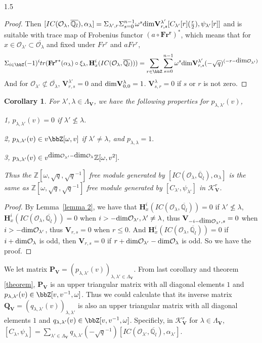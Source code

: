 \documentclass[10pt]{amsart}
\newtheorem{corollary}[theorem]{Corollary}
\def\dim{\mbox{\rm dim}}   \def\End{\mbox{\rm End}}
\def\bfV{{\mathbf V}}
\def\bfH{{\mathbf H}} \def\bfP{{\mathbf P}} \def\bfa{{\bf a}}
\def\bfV{\mathbf{V}}
\newcommand\bbq{{\mathbb Q}}
\newcommand\mk{{\mathcal{K}}}
\newcommand\mo{{\mathcal{O}}}
\begin{document}
\begin{spacing}{1.5}
\begin{proof}
Then $[IC(\mo_{\lambda},\overline{\bbq_l}),\alpha_{\lambda}]=\Sigma_{\lambda',r}\Sigma_{s=0}^{n-1}\omega^s \dim \bfV^{\lambda'}_{r,s} [C_{\lambda'}[r](\frac{r}{2}),\psi_{\lambda'}[r]]$ and is suitable with trace map of Frobenius functor  $(a\circ \mathbf{Fr^r})^*$, which means that for $x\in \mo_{\lambda'}\subset \overline{\mo_{\lambda}}$ and fixed under $Fr^r$ and $aFr^r$, $$\Sigma_{i\in \bbZ}(-1)^i tr(\mathbf{Fr^r}^*(\alpha_{\lambda})\circ \xi_{\lambda}, \bfH_x^i(IC(\mo_{\lambda},\overline{\bbq_l})))=\sum_{r\in \bbZ}\sum_{s=0}^{n-1}\omega^s \dim \bfV^{\lambda'}_{r,s} (-\sqrt{q})^{(-r-\dim \mo_{\lambda'})}$$
And for $\mo_{\lambda'}\not\subset \overline{\mo_{\lambda}}$, $\bfV_{r,s}^{\lambda'}=0$ and $\dim \bfV^{\lambda}_{0,0}=1$. $\bfV^{\lambda}_{s,r}=0$ if $s$ or $r$ is not zero. 
\end{proof}
\begin{corollary}
    For $\lambda', \lambda\in \Lambda_{\bfV}$, we have the following properties for $p_{\lambda,\lambda'}(v)$,

    1, $p_{\lambda, \lambda'}(v) = 0$ if $\lambda'\nleqslant \lambda$.

    2, $p_{\lambda, \lambda'}(v)\in v\bbZ[\omega,v]$ if $\lambda'\not=\lambda$, and $p_{\lambda, \lambda} = 1.$

    3, $p_{\lambda, \lambda'}(v) \in v^{\dim\mo_{\lambda'}-\dim\mo_{\lambda}}\mathbb{Z}[\omega,v^2].$

    Thus the $\mathbb{Z}[\omega,\sqrt{q},\sqrt{q}^{-1}]$ free module generated by $[IC(\mathcal{O}_{\lambda}, \overline{\mathbb{Q}}_l), \alpha_{\lambda}]$ is the same as $\mathbb{Z}[\omega,\sqrt{q},\sqrt{q}^{-1}]$ free module generated by $[C_{\lambda'}, \psi_{\lambda'}]$ in $\mk_{\bfV}^r$.
\end{corollary}
\begin{proof}
    By Lemma~\ref{lemma 2}, we have that $\bfH^i_x(IC(\mo_{\lambda},\overline{\bbq_l}))=0$ if $\lambda'\nleqslant \lambda$, $\bfH^i_x(IC(\mo_{\lambda},\overline{\bbq_l}))=0 $ when $i>-\dim\mo_{\lambda'}, \lambda'\not=\lambda$, thus $\bfV_{-i-\dim \mo_{\lambda'},s}=0$ when $i>-\dim\mo_{\lambda'}$, thus $\bfV_{r,s}=0$ when $r\leq 0$. And $\bfH^i_x(IC(\mo_{\lambda},\overline{\bbq_l}))=0$ if $i+\dim\mo_{\lambda}$ is odd, then $\bfV_{r,s}=0$ if $r+\dim \mo_{\lambda'}-\dim \mo_{\lambda}$ is odd. So we have the proof.
\end{proof}

We let matrix $\mathbf{P}_{\bfV}=(p_{\lambda,\lambda'}(v))_{\lambda,\lambda'\in \Lambda_{\bfV}}$. From last corollary and theorem \ref{theorem}, $\mathbf{P}_{\bfV}$ is an upper triangular matrix with all diagonal elements $1$ and $p_{\lambda,\lambda'}(v)\in \bbZ[v,v^{-1},\omega]$. Thus we could calculate that its inverse matrix $\mathbf{Q}_{\bfV}=(q_{\lambda,\lambda'}(v))_{\lambda,\lambda'}$ is also an upper triangular matrix with all diagonal elements $1$ and $q_{\lambda,\lambda'}(v)\in \bbZ[v,v^{-1},\omega]$. Specificly, in $\mk^r_{\bfV}$ for $\lambda\in \Lambda_{\bfV}$, $[C_{\lambda},\psi_{\lambda}]=\sum_{\lambda'\in \Lambda_{\bfV}}q_{\lambda,\lambda'}(-\sqrt{q}^{-1})[IC(\mo_{\lambda'},\overline{\bbq_l}),\alpha_{\lambda'}]$.


\end{spacing}
\end{document}
